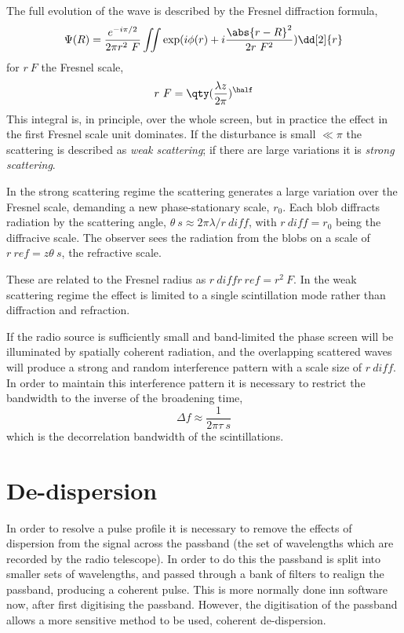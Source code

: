 The full evolution of the wave is described by the Fresnel diffraction
formula,
\begin{equation}
  \label{eq:113}
  \Psi(R) = \frac{e^{-i \pi/2}}{ 2 \pi r^2~F} \iint \exp( i \phi(r) + i \frac{\abs{r-R}^2}{2 r~F^2} ) \dd[2]{r} 
\end{equation}
for $r~F$ the Fresnel scale,
\[ r~F = \qty( \frac{\lambda z}{2 \pi} )^{\half} \] This integral is,
in principle, over the whole screen, but in practice the effect in the
first Fresnel scale unit dominates. If the disturbance is small $\ll
\pi$ the scattering is described as \emph{weak scattering}; if there
are large variations it is \emph{strong scattering}.

In the strong scattering regime the scattering generates a large
variation over the Fresnel scale, demanding a new phase-stationary
scale, $r_0$. Each blob diffracts radiation by the scattering angle,
$\theta~s \approx 2 \pi \lambda / r~{diff}$, with $r~{diff} = r_0$
being the diffracive scale. The observer sees the radiation from the
blobs on a scale of $r~{ref}= z\theta~s$, the refractive scale.

These are related to the Fresnel radius as $r~{diff} r~{ref} =
r^2~F$. In the weak scattering regime the effect is limited to a
single scintillation mode rather than diffraction and refraction.

If the radio source is sufficiently small and band-limited the phase
screen will be illuminated by spatially coherent radiation, and the
overlapping scattered waves will produce a strong and random
interference pattern with a scale size of $r~{diff}$. In order to
maintain this interference pattern it is necessary to restrict the
bandwidth to the inverse of the broadening time,
\[ \Delta f \approx \frac{1}{2 \pi \tau~s} \] which is the
decorrelation bandwidth of the scintillations.

\section{De-dispersion}
\label{sec:de-dispersion}

In order to resolve a pulse profile it is necessary to remove the
effects of dispersion from the signal across the passband (the set of
wavelengths which are recorded by the radio telescope). In order to do
this the passband is split into smaller sets of wavelengths, and
passed through a bank of filters to realign the passband, producing a
coherent pulse. This is more normally done inn software now, after
first digitising the passband. However, the digitisation of the
passband allows a more sensitive method to be used, coherent
de-dispersion.

